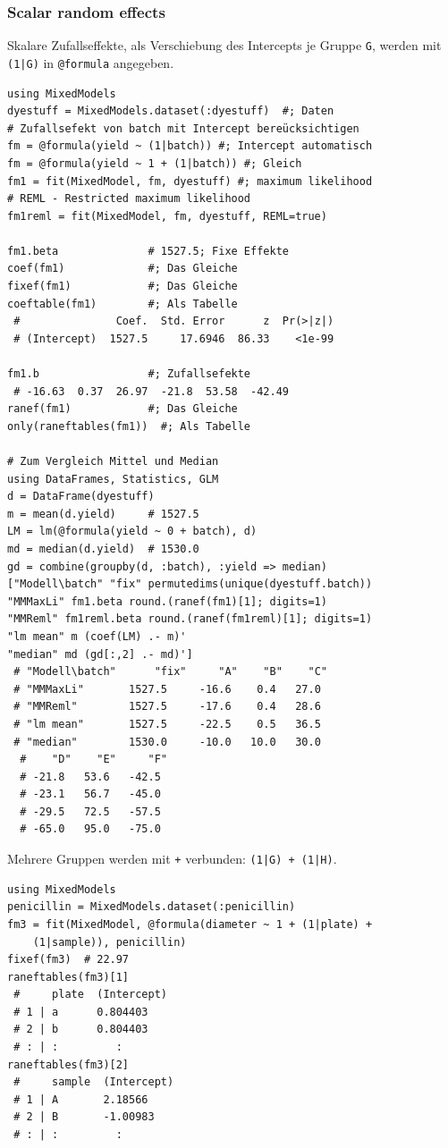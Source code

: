 \documentclass[10pt,twocolumn]{scrartcl}
\begin{document}
\subsubsection{Scalar random effects}

Skalare Zufallseffekte, als Verschiebung des Intercepts je Gruppe
\lstinline|G|, werden mit \lstinline"(1|G)" in \lstinline|@formula|
angegeben.

\begin{lstlisting}
using MixedModels
dyestuff = MixedModels.dataset(:dyestuff)  #; Daten
# Zufallsefekt von batch mit Intercept bereücksichtigen
fm = @formula(yield ~ (1|batch)) #; Intercept automatisch
fm = @formula(yield ~ 1 + (1|batch)) #; Gleich
fm1 = fit(MixedModel, fm, dyestuff) #; maximum likelihood
# REML - Restricted maximum likelihood
fm1reml = fit(MixedModel, fm, dyestuff, REML=true)

fm1.beta              # 1527.5; Fixe Effekte
coef(fm1)             #; Das Gleiche
fixef(fm1)            #; Das Gleiche
coeftable(fm1)        #; Als Tabelle
 #               Coef.  Std. Error      z  Pr(>|z|)
 # (Intercept)  1527.5     17.6946  86.33    <1e-99

fm1.b                 #; Zufallsefekte
 # -16.63  0.37  26.97  -21.8  53.58  -42.49
ranef(fm1)            #; Das Gleiche
only(raneftables(fm1))  #; Als Tabelle

# Zum Vergleich Mittel und Median
using DataFrames, Statistics, GLM
d = DataFrame(dyestuff)
m = mean(d.yield)     # 1527.5
LM = lm(@formula(yield ~ 0 + batch), d)
md = median(d.yield)  # 1530.0
gd = combine(groupby(d, :batch), :yield => median)
["Modell\batch" "fix" permutedims(unique(dyestuff.batch))
"MMMaxLi" fm1.beta round.(ranef(fm1)[1]; digits=1)
"MMReml" fm1reml.beta round.(ranef(fm1reml)[1]; digits=1)
"lm mean" m (coef(LM) .- m)'
"median" md (gd[:,2] .- md)']
 # "Modell\batch"      "fix"     "A"    "B"    "C"
 # "MMMaxLi"       1527.5     -16.6    0.4   27.0
 # "MMReml"        1527.5     -17.6    0.4   28.6
 # "lm mean"       1527.5     -22.5    0.5   36.5
 # "median"        1530.0     -10.0   10.0   30.0
  #    "D"    "E"     "F"
  # -21.8   53.6   -42.5
  # -23.1   56.7   -45.0
  # -29.5   72.5   -57.5
  # -65.0   95.0   -75.0
\end{lstlisting}

Mehrere Gruppen werden mit \lstinline|+| verbunden: \lstinline"(1|G) + (1|H)".

\begin{lstlisting}
using MixedModels
penicillin = MixedModels.dataset(:penicillin)
fm3 = fit(MixedModel, @formula(diameter ~ 1 + (1|plate) +
    (1|sample)), penicillin)
fixef(fm3)  # 22.97
raneftables(fm3)[1]
 #     plate  (Intercept)
 # 1 | a      0.804403
 # 2 | b      0.804403
 # : | :         :
raneftables(fm3)[2]
 #     sample  (Intercept)
 # 1 | A       2.18566
 # 2 | B       -1.00983
 # : | :         :
\end{lstlisting}
\end{document}
